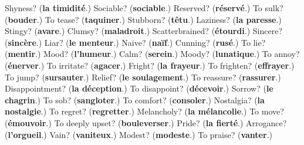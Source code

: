 \begin{tcolorbox}[breakable,colback=teal!4,colframe=teal!35!black,title={Before you move on}]
Shyness? (\textbf{la timidité}.) Sociable? (\textbf{sociable}.) Reserved? (\textbf{réservé}.) To sulk? (\textbf{bouder}.) To tease? (\textbf{taquiner}.) Stubborn? (\textbf{têtu}.) Laziness? (\textbf{la paresse}.) Stingy? (\textbf{avare}.) Clumsy? (\textbf{maladroit}.) Scatterbrained? (\textbf{étourdi}.) Sincere? (\textbf{sincère}.) Liar? (\textbf{le menteur}.) Naive? (\textbf{naïf}.) Cunning? (\textbf{rusé}.) To lie? (\textbf{mentir}.) Mood? (\textbf{l'humeur}.) Calm? (\textbf{serein}.) Moody? (\textbf{lunatique}.) To annoy? (\textbf{énerver}.) To irritate? (\textbf{agacer}.) Fright? (\textbf{la frayeur}.) To frighten? (\textbf{effrayer}.) To jump? (\textbf{sursauter}.) Relief? (\textbf{le soulagement}.) To reassure? (\textbf{rassurer}.) Disappointment? (\textbf{la déception}.) To disappoint? (\textbf{décevoir}.) Sorrow? (\textbf{le chagrin}.) To sob? (\textbf{sangloter}.) To comfort? (\textbf{consoler}.) Nostalgia? (\textbf{la nostalgie}.) To regret? (\textbf{regretter}.) Melancholy? (\textbf{la mélancolie}.) To move? (\textbf{émouvoir}.) To deeply upset? (\textbf{bouleverser}.) Pride? (\textbf{la fierté}.) Arrogance? (\textbf{l'orgueil}.) Vain? (\textbf{vaniteux}.) Modest? (\textbf{modeste}.) To praise? (\textbf{vanter}.)
\end{tcolorbox}
